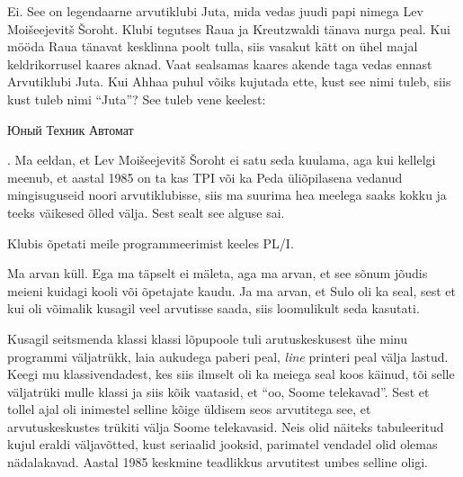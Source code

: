 Ei. See on legendaarne arvutiklubi Juta, mida vedas 
juudi papi nimega Lev Moišeejevitš Šoroht. Klubi 
tegutses Raua ja  Kreutzwaldi tänava nurga peal. Kui mööda Raua tänavat  
kesklinna poolt tulla, siis vasakut kätt on ühel majal keldrikorrusel kaares 
aknad. Vaat sealsamas kaares akende taga vedas ennast Arvutiklubi Juta. Kui 
Ahhaa puhul võiks kujutada ette, kust see nimi tuleb, siis kust tuleb nimi 
\enquote{Juta}? See tuleb vene keelest: \begin{russian}Юный Техник 
Автомат\end{russian}. Ma eeldan, et Lev Moišeejevitš Šoroht ei satu seda  
kuulama, aga kui  kellelgi meenub, et aastal 1985  on ta kas TPI või ka Peda 
üliõpilasena vedanud mingisuguseid noori arvutiklubisse, siis ma suurima hea 
meelega saaks kokku ja teeks väikesed õlled välja. Sest sealt see alguse sai. 

Klubis õpetati meile programmeerimist keeles PL/I.


Ma arvan küll. Ega ma täpselt ei mäleta, aga ma arvan, et see sõnum jõudis 
meieni kuidagi kooli või õpetajate kaudu. Ja ma arvan, et Sulo oli ka seal, 
sest et kui oli võimalik kusagil veel arvutisse saada, siis loomulikult seda 
kasutati.


Kusagil seitsmenda klassi klassi lõpupoole tuli  arutuskeskusest ühe minu 
programmi väljatrükk, laia aukudega paberi peal, \emph{line} printeri peal 
välja lastud. Keegi mu klassivendadest, kes siis ilmselt oli ka meiega seal 
koos käinud, tõi selle väljatrüki mulle klassi ja siis kõik vaatasid, et 
\enquote{oo, Soome telekavad}. Sest et tollel ajal oli inimestel selline kõige 
üldisem seos arvutitega see, et arvutuskeskustes trükiti välja Soome 
telekavasid. Neis olid näiteks tabuleeritud kujul eraldi väljavõtted, kust 
seriaalid jooksid, parimatel vendadel olid olemas nädalakavad. Aastal 1985 
keskmine teadlikkus arvutitest umbes selline oligi.


